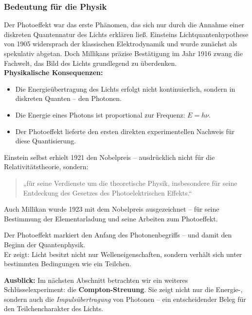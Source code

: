 \subsubsection{Bedeutung für die Physik}

Der Photoeffekt war das erste Phänomen, das sich nur durch die Annahme einer diskreten Quantennatur des Lichts erklären ließ. Einsteins Lichtquantenhypothese von 1905 widersprach der klassischen Elektrodynamik und wurde zunächst als spekulativ abgetan. Doch Millikans präzise Bestätigung im Jahr 1916 zwang die Fachwelt, das Bild des Lichts grundlegend zu überdenken.\\

\textbf{Physikalische Konsequenzen:}
\begin{itemize}
	\item Die Energieübertragung des Lichts erfolgt nicht kontinuierlich, sondern in diskreten Quanten – den Photonen.
	\item Die Energie eines Photons ist proportional zur Frequenz: \( E = h\nu \).
	\item Der Photoeffekt lieferte den ersten direkten experimentellen Nachweis für diese Quantisierung.
\end{itemize}

Einstein selbst erhielt 1921 den Nobelpreis – ausdrücklich nicht für die Relativitätstheorie, sondern:
\begin{quote}
	„für seine Verdienste um die theoretische Physik, insbesondere für seine Entdeckung des Gesetzes des Photoelektrischen Effekts.“
\end{quote}

Auch Millikan wurde 1923 mit dem Nobelpreis ausgezeichnet – für seine Bestimmung der Elementarladung und seine Arbeiten zum Photoeffekt.

\vspace{1em}
\begin{tcolorbox}[hinweisbox, title=Fazit]
	\label{box:fazit der photo}
	\small
	Der Photoeffekt markiert den Anfang des Photonenbegriffs – und damit den Beginn der Quantenphysik.\\
	Er zeigt: Licht besitzt nicht nur Welleneigenschaften, sondern verhält sich unter bestimmten Bedingungen wie ein Teilchen.
\end{tcolorbox}
\vspace{1em}
\textbf{Ausblick:}  
Im nächsten Abschnitt betrachten wir ein weiteres Schlüsselexperiment: die \textbf{Compton-Streuung}. Sie zeigt nicht nur die Energie-, sondern auch die \emph{Impulsübertragung} von Photonen – ein entscheidender Beleg für den Teilchencharakter des Lichts.

